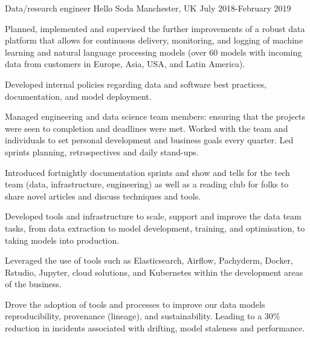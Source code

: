 \begin{cventries}
\cventry
{Data/research engineer} %
{Hello Soda } %
{Manchester, UK} %
{July 2018-February 2019 } %
{ %
\begin{cvitems}
\item {Planned, implemented and supervised the further improvements of a robust data platform that allows for continuous delivery, monitoring, and logging of machine learning and natural language processing models (over 60 models with incoming data from customers in Europe, Asia, USA, and Latin America).}
\item{Developed internal policies regarding data and software best practices, documentation, and model deployment. }
\item{Managed engineering and data science team members: ensuring that the projects were seen to completion and deadlines were met. Worked with the team and individuals to set personal development and business goals every quarter. Led sprints planning, retrospectives and daily stand-ups.}
\item{Introduced fortnightly documentation sprints and show and tells for the tech team (data, infrastructure, engineering) as well as a reading club for folks to share novel articles and discuss techniques and tools.} 
\item{Developed tools and infrastructure to scale, support and improve the data team tasks, from data extraction to model development, training, and optimisation, to taking models into production.}
\item{Leveraged the use of tools such as Elasticsearch, Airflow, Pachyderm, Docker, Rstudio, Jupyter, cloud solutions, and Kubernetes within the development areas of the business.}
\item{Drove the adoption of tools and processes to improve our data models reproducibility, provenance (lineage), and sustainability. Leading to a 30\% reduction in incidents associated with drifting, model staleness and performance.}
\end{cvitems}
}



\end{cventries}
